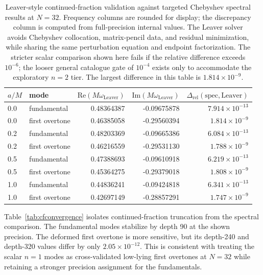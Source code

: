 \documentclass[12pt,a4paper]{article}
\begin{document}
\begin{table}[H]
\centering
\footnotesize
\renewcommand{\arraystretch}{1.14}
\begin{tabular}{llrrr}
\toprule
\(a/M\) & mode &
\(\mathrm{Re}(M\omega_{\mathrm{Leaver}})\) &
\(\mathrm{Im}(M\omega_{\mathrm{Leaver}})\) &
\(\Delta_{\mathrm{rel}}(\mathrm{spec},\mathrm{Leaver})\)\\
\midrule
0.0 & fundamental & 0.48364387 & -0.09675878 & \(7.914\times10^{-13}\)\\
0.0 & first overtone & 0.46385058 & -0.29560394 & \(1.814\times10^{-9}\)\\
0.2 & fundamental & 0.48203369 & -0.09665386 & \(6.084\times10^{-13}\)\\
0.2 & first overtone & 0.46216559 & -0.29531130 & \(1.788\times10^{-9}\)\\
0.5 & fundamental & 0.47388693 & -0.09610918 & \(6.219\times10^{-13}\)\\
0.5 & first overtone & 0.45364275 & -0.29379018 & \(1.808\times10^{-9}\)\\
1.0 & fundamental & 0.44836241 & -0.09424818 & \(6.341\times10^{-13}\)\\
1.0 & first overtone & 0.42697149 & -0.28857291 & \(1.747\times10^{-9}\)\\
\bottomrule
\end{tabular}
\caption{Leaver-style continued-fraction validation against targeted Chebyshev spectral results at \(N=32\). Frequency columns are rounded for display; the discrepancy column is computed from full-precision internal values. The Leaver solver avoids Chebyshev collocation, matrix-pencil data, and residual minimization, while sharing the same perturbation equation and endpoint factorization. The stricter scalar comparison shown here fails if the relative difference exceeds \(10^{-6}\); the looser general catalogue gate of \(10^{-4}\) exists only to accommodate the exploratory \(n=2\) tier. The largest difference in this table is \(1.814\times10^{-9}\).}
\label{tab:leavercomparison}
\end{table}

Table~\ref{tab:cfconvergence} isolates continued-fraction truncation from the
spectral comparison.  The fundamental modes stabilize by depth 90 at the shown
precision.  The deformed first overtone is more sensitive, but its depth-240
and depth-320 values differ by only \(2.05\times10^{-12}\).  This is consistent
with treating the scalar \(n=1\) modes as cross-validated low-lying first overtones at \(N=32\) while retaining a
stronger precision assignment for the fundamentals.
\end{document}
